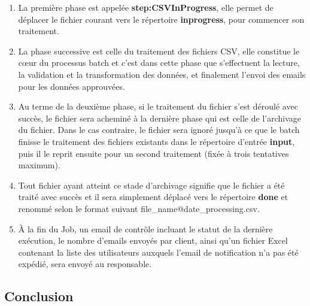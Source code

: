 \begin{enumerate}
    \item La première phase est appelée \textbf{step:CSVInProgress}, elle permet de déplacer le fichier courant vers le répertoire \textbf{inprogress}, pour commencer son traitement.
    \item La phase successive est celle du traitement des fichiers CSV, elle constitue le cœur du processus batch et c'est dans cette phase que s'effectuent la lecture, la validation et la transformation des données, et finalement l'envoi des emails pour les données approuvées.
    \item Au terme de la deuxième phase, si le traitement du fichier s'est déroulé avec succès, le fichier sera acheminé à la dernière phase qui est celle de l'archivage du fichier. Dans le cas contraire, le fichier sera ignoré jusqu'à ce que le batch finisse le traitement des fichiers existants dans le répertoire d'entrée \textbf{input}, puis il le reprit ensuite pour un second traitement (fixée à trois tentatives maximum).\\
    \item Tout fichier ayant atteint ce stade d'archivage signifie que le fichier a été traité avec succès et il sera simplement déplacé vers le répertoire \textbf{done} et renommé selon le format suivant file\_name@date\_processing.csv.
    \item À la fin du Job, un email de contrôle incluant le statut de la dernière exécution, le nombre d'emails envoyés par client, ainsi qu'un fichier Excel contenant la liste des utilisateurs auxquels l'email de notification n'a pas été expédié, sera envoyé au responsable.
\end{enumerate}
\subsection*{Conclusion}
